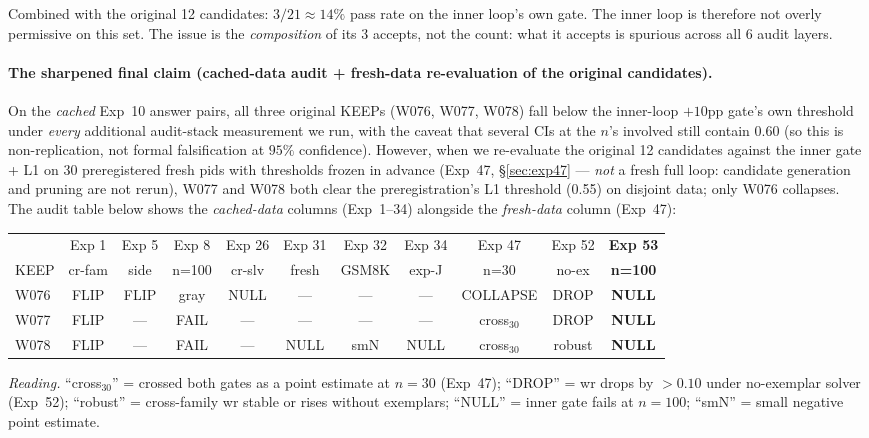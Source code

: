 \documentclass{article}
\begin{document}
\begin{CJK*}{UTF8}{gbsn}
Combined with the original 12 candidates: \(3 / 21 \approx 14\%\)
pass rate on the inner loop's own gate. The
inner loop is therefore not overly permissive on this set. The issue is the \emph{composition} of its 3
accepts, not the count: what it accepts is spurious across all 6
audit layers.

\paragraph{The sharpened final claim (cached-data audit + fresh-data
re-evaluation of the original candidates).} On the \emph{cached}
Exp~10 answer pairs, all three
original KEEPs (W076, W077, W078) fall below the inner-loop
\(+10\)pp gate's own threshold under \emph{every} additional
audit-stack measurement we run, with the caveat that several CIs
at the \(n\)'s involved still contain \(0.60\) (so this is
non-replication, not formal falsification at \(95\%\) confidence).
However, when we re-evaluate the original 12 candidates against the
inner gate + L1 on 30 preregistered fresh pids with thresholds
frozen in advance (Exp~47, \S\ref{sec:exp47} --- \emph{not} a fresh
full loop: candidate generation and pruning are not rerun), W077 and
W078 both clear the preregistration's L1 threshold (0.55) on
disjoint data; only W076 collapses. The audit table below shows
the \emph{cached-data} columns (Exp~1--34) alongside the
\emph{fresh-data} column (Exp~47):

\begin{center}\scriptsize
\begin{tabular}{l c c c c c c c c c c}
  \toprule
  & Exp 1 & Exp 5 & Exp 8 & Exp 26 & Exp 31 & Exp 32 & Exp 34 & Exp 47 & Exp 52 & \textbf{Exp 53} \\
  KEEP & cr-fam & side & n=100 & cr-slv & fresh & GSM8K & exp-J & n=30 & no-ex & \textbf{n=100} \\
  \midrule
  W076 & FLIP & FLIP & gray & NULL & --- & --- & --- & COLLAPSE & DROP & \textbf{NULL} \\
  W077 & FLIP &  --- & FAIL &  --- & --- & --- & --- & cross\(_{30}\) & DROP & \textbf{NULL} \\
  W078 & FLIP &  --- & FAIL &  --- & NULL & smN & NULL & cross\(_{30}\) & robust & \textbf{NULL} \\
  \bottomrule
\end{tabular}
\end{center}

\noindent\emph{Reading.} ``cross\(_{30}\)'' = crossed both gates
as a point estimate at \(n=30\) (Exp~47); ``DROP'' = wr drops by
\(>0.10\) under no-exemplar solver (Exp~52); ``robust'' =
cross-family wr stable or rises without exemplars; ``NULL'' =
inner gate fails at \(n=100\); ``smN'' = small negative point
estimate.


\end{CJK*}
\end{document}
